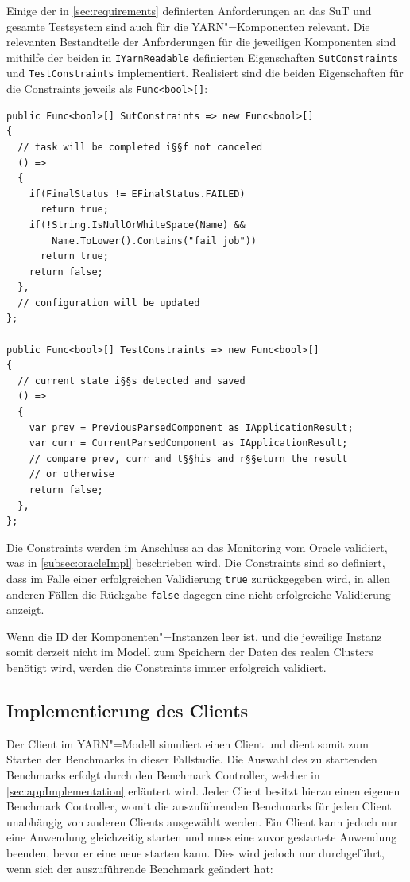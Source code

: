 Einige der in \cref{sec:requirements} definierten Anforderungen an das \ac{SuT} und gesamte Testsystem sind auch für die \ac{YARN}"=Komponenten relevant.
Die relevanten Bestandteile der Anforderungen für die jeweiligen Komponenten sind mithilfe der beiden in \texttt{IYarnReadable} definierten Eigenschaften \texttt{SutConstraints} und \texttt{TestConstraints} implementiert.
Realisiert sind die beiden Eigenschaften für die Constraints jeweils als \texttt{Func<bool>[]}:

\begin{lstlisting}[label=lst:constraintDefinition,style=cs,
caption={[Definition der Constraints in YarnApp]
    Definition der Constraints in \texttt{YarnApp} (gekürzt)}]
public Func<bool>[] SutConstraints => new Func<bool>[]
{
  // task will be completed i§§f not canceled
  () =>
  {
    if(FinalStatus != EFinalStatus.FAILED)
      return true;
    if(!String.IsNullOrWhiteSpace(Name) &&
        Name.ToLower().Contains("fail job"))
      return true;
    return false;
  },
  // configuration will be updated
};

public Func<bool>[] TestConstraints => new Func<bool>[]
{
  // current state i§§s detected and saved
  () =>
  {
    var prev = PreviousParsedComponent as IApplicationResult;
    var curr = CurrentParsedComponent as IApplicationResult;
    // compare prev, curr and t§§his and r§§eturn the result
    // or otherwise
    return false;
  },
};
\end{lstlisting}

Die Constraints werden im Anschluss an das Monitoring vom Oracle validiert, was in \cref{subsec:oracleImpl} beschrieben wird.
Die Constraints sind so definiert, dass im Falle einer erfolgreichen Validierung \texttt{true} zurückgegeben wird, in allen anderen Fällen die Rückgabe \texttt{false} dagegen eine nicht erfolgreiche Validierung anzeigt.

Wenn die ID der Komponenten"=Instanzen leer ist, und die jeweilige Instanz somit derzeit nicht im Modell zum Speichern der Daten des realen Clusters benötigt wird, werden die Constraints immer erfolgreich validiert.

\subsection{Implementierung des Clients}
\label{subsec:yarnClient}

Der Client im \ac{YARN}"=Modell simuliert einen Client und dient somit zum Starten der Benchmarks in dieser Fallstudie.
Die Auswahl des zu startenden Benchmarks erfolgt durch den Benchmark Controller, welcher in \cref{sec:appImplementation} erläutert wird.
Jeder Client besitzt hierzu einen eigenen Benchmark Controller, womit die auszuführenden Benchmarks für jeden Client unabhängig von anderen Clients ausgewählt werden.
Ein Client kann jedoch nur eine Anwendung gleichzeitig starten und muss eine zuvor gestartete Anwendung beenden, bevor er eine neue starten kann.
Dies wird jedoch nur durchgeführt, wenn sich der auszuführende Benchmark geändert hat:

